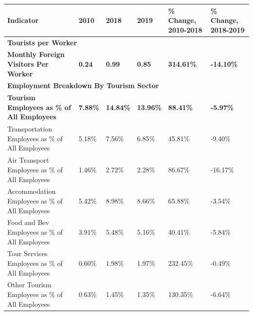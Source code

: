 \begin{tabular}[t]{l|l|l|l|l|l}
\hline
Indicator & 2010 & 2018 & 2019 & \% Change, 2010-2018 & \% Change, 2018-2019\\
\hline
\multicolumn{6}{l}{\textbf{\textbf{Tourists per Worker}}}\\
\hline
\hspace{1em}\textbf{Monthly Foreign Visitors Per Worker} & \textbf{0.24} & \textbf{0.99} & \textbf{0.85} & \textbf{314.61\%} & \textbf{-14.10\%}\\
\hline
\multicolumn{6}{l}{\textbf{\textbf{Employment Breakdown By Tourism Sector}}}\\
\hline
\hspace{1em}\textbf{Tourism Employees as \% of All Employees} & \textbf{7.88\%} & \textbf{14.84\%} & \textbf{13.96\%} & \textbf{88.41\%} & \textbf{-5.97\%}\\
\hline
\hspace{1em}Transportation Employees as \% of All Employees & 5.18\% & 7.56\% & 6.85\% & 45.81\% & -9.40\%\\
\hline
\hspace{1em}Air Transport Employees as \% of All Employees & 1.46\% & 2.72\% & 2.28\% & 86.67\% & -16.17\%\\
\hline
\hspace{1em}Accommodation Employees as \% of All Employees & 5.42\% & 8.98\% & 8.66\% & 65.88\% & -3.54\%\\
\hline
\hspace{1em}Food and Bev Employees as \% of All Employees & 3.91\% & 5.48\% & 5.16\% & 40.41\% & -5.84\%\\
\hline
\hspace{1em}Tour Services Employees as \% of All Employees & 0.60\% & 1.98\% & 1.97\% & 232.45\% & -0.49\%\\
\hline
\hspace{1em}Other Tourism Employees as \% of All Employees & 0.63\% & 1.45\% & 1.35\% & 130.35\% & -6.64\%\\
\hline
\end{tabular}
